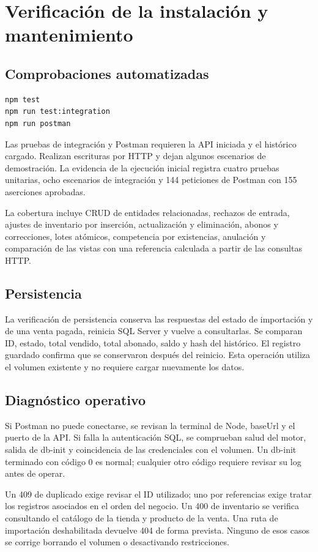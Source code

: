 \section{Verificación de la instalación y mantenimiento}
\subsection{Comprobaciones automatizadas}
\begin{lstlisting}
npm test
npm run test:integration
npm run postman
\end{lstlisting}
Las pruebas de integración y Postman requieren la API iniciada y el histórico cargado. Realizan escrituras por HTTP y dejan algunos escenarios de demostración. La evidencia de la ejecución inicial registra cuatro pruebas unitarias, ocho escenarios de integración y 144 peticiones de Postman con 155 aserciones aprobadas.

La cobertura incluye CRUD de entidades relacionadas, rechazos de entrada, ajustes de inventario por inserción, actualización y eliminación, abonos y correcciones, lotes atómicos, competencia por existencias, anulación y comparación de las vistas con una referencia calculada a partir de las consultas HTTP.

\subsection{Persistencia}
La verificación de persistencia conserva las respuestas del estado de importación y de una venta pagada, reinicia SQL Server y vuelve a consultarlas. Se comparan ID, estado, total vendido, total abonado, saldo y hash del histórico. El registro guardado confirma que se conservaron después del reinicio. Esta operación utiliza el volumen existente y no requiere cargar nuevamente los datos.

\subsection{Diagnóstico operativo}
Si Postman no puede conectarse, se revisan la terminal de Node, baseUrl y el puerto de la API. Si falla la autenticación SQL, se comprueban salud del motor, salida de db-init y coincidencia de las credenciales con el volumen. Un db-init terminado con código 0 es normal; cualquier otro código requiere revisar su log antes de operar.

Un 409 de duplicado exige revisar el ID utilizado; uno por referencias exige tratar los registros asociados en el orden del negocio. Un 400 de inventario se verifica consultando el catálogo de la tienda y producto de la venta. Una ruta de importación deshabilitada devuelve 404 de forma prevista. Ninguno de esos casos se corrige borrando el volumen o desactivando restricciones.

